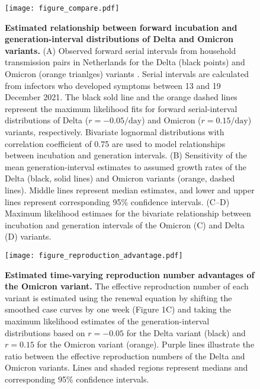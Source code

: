 \documentclass[12pt]{article}
\begin{document}
\begin{figure}[!th]
\texttt{[image: figure\_compare.pdf]}
\caption{
\textbf{Estimated relationship between forward incubation and generation-interval distributions of Delta and Omicron variants.}
(A) Observed forward serial intervals from household transmission pairs in Netherlands for the Delta (black points) and Omicron (orange trianlges) variants \citep{backer2021omicron}.
Serial intervals are calculated from infectors who developed symptoms between 13 and 19 December 2021.
The black sold line and the orange dashed lines represent the maximum likelihood fits for forward serial-interval distributions of Delta ($r=-0.05/\textrm{day}$) and Omicron ($r=0.15/\textrm{day}$) variants, respectively. 
Bivariate lognormal distributions with correlation coefficient of 0.75 are used to model relationships between incubation and generation intervals.
(B) Sensitivity of the mean generation-interval estimates to assumed growth rates of the Delta (black, solid lines) and Omicron variants (orange, dashed lines).
Middle lines represent median estimates, and lower and upper lines represent corresponding 95\% confidence intervals.
(C--D) Maximum likelihood estimaes for the bivariate relationship between incubation and generation intervals of the Omicron (C) and Delta (D) variants.
}
\end{figure}

\pagebreak

\begin{figure}[!th]
\texttt{[image: figure\_reproduction\_advantage.pdf]}
\caption{
\textbf{Estimated time-varying reproduction number advantages of the Omicron variant.}
The effective reproduction number of each variant is estimated using the renewal equation by shifting the smoothed case curves by one week (Figure 1C) and taking the maximum likelihood estimates of the generation-interval distributions based on $r=-0.05$ for the Delta variant (black) and $r=0.15$ for the Omicron variant (orange).
Purple lines illustrate the ratio between the effective reproduction numbers of the Delta and Omicron variants.
Lines and shaded regions represent medians and corresponding 95\% confidence intervals.
}
\end{figure}


\pagebreak
\end{document}
